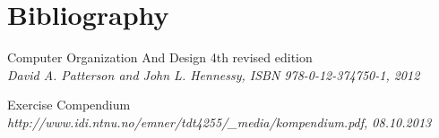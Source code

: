 \section{Bibliography}

\begin{enumerate}
	 Computer Organization And Design 4th revised edition\\
		\emph{David A. Patterson and John L. Hennessy, ISBN 978-0-12-374750-1, 2012} 

	 Exercise Compendium\\
		\emph{http://www.idi.ntnu.no/emner/tdt4255/\_media/kompendium.pdf, 08.10.2013}

\end{enumerate}
